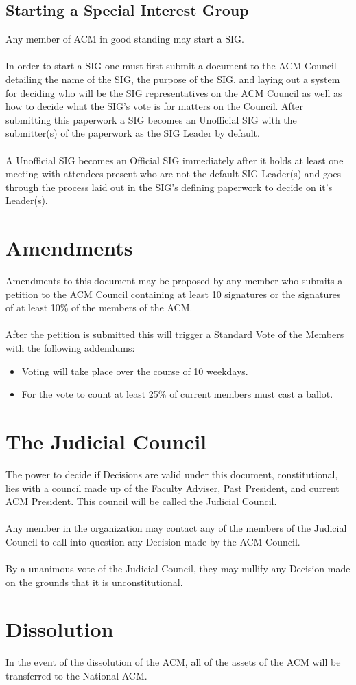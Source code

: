 \documentclass[12pt,titlepage]{article}
\begin{document}
\subsection{Starting a Special Interest Group}

Any member of ACM in good standing may start a SIG.\\
\\
In order to start a SIG one must first submit a document to the ACM Council detailing the name of the SIG, the purpose of the SIG, and laying out a system for deciding who will be the SIG representatives on the ACM Council as well as how to decide what the SIG's vote is for matters on the Council. After submitting this paperwork a SIG becomes an Unofficial SIG with the submitter(s) of the paperwork as the SIG Leader by default.\\
\\
A Unofficial SIG becomes an Official SIG immediately after it holds at least one meeting with attendees present who are not the default SIG Leader(s) and goes through the process laid out in the SIG's defining paperwork to decide on it's Leader(s).

\section{Amendments}

Amendments to this document may be proposed by any member who submits a petition to the ACM Council containing at least 10 signatures or the signatures of at least 10\% of the members of the ACM.\\
\\
After the petition is submitted this will trigger a Standard Vote of the Members with the following addendums:
\begin{itemize}
	\item Voting will take place over the course of 10 weekdays.
	\item For the vote to count at least 25\% of current members must cast a ballot.
\end{itemize}

\section{The Judicial Council}

The power to decide if Decisions are valid under this document, constitutional, lies with a council made up of the Faculty Adviser, Past President, and current ACM President. This council will be called the Judicial Council.\\
\\
Any member in the organization may contact any of the members of the Judicial Council to call into question any Decision made by the ACM Council.\\
\\
By a unanimous vote of the Judicial Council, they may nullify any Decision made on the grounds that it is unconstitutional.

\section{Dissolution}

In the event of the dissolution of the ACM, all of the assets of the ACM will be transferred to the National ACM.
\end{document}
